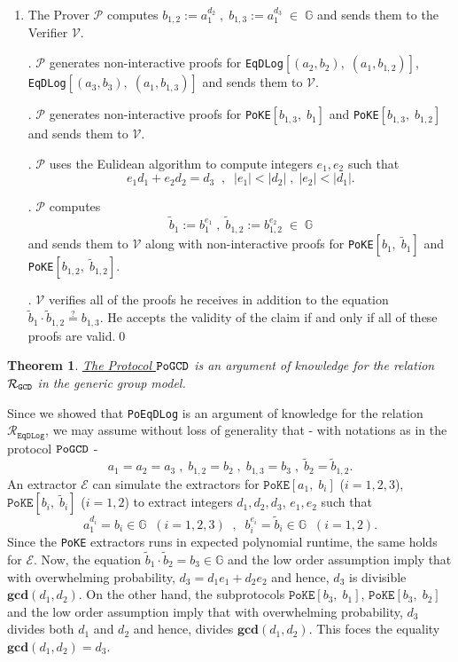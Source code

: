 \documentclass[11pt, lettersize, notitlepage, leqno, footskip=0.6cm]{article}
\newcommand{\ttt}{\texttt}
\newcommand{\bG}{\mathbb{G}}
\newcommand{\wti}{\widetilde}
\newcommand{\mc}{\mathcal}
\newcommand{\mbf}{\mathbf}
\newcommand{\mP}{\mc{P}}
\newcommand{\V}{\mc{V}}
\newcommand{\vs}{\vspace{-0.15cm}}
\newcommand{\op}{overwhelming probability}
\newcommand{\GCD}{\mbf{gcd}}
\newcommand{\E}{\mc{E}}
\newtheorem{Thm}{Theorem}[section]
\numberwithin{equation}{section}
\begin{document}
\begin{enumerate}[wide, labelwidth=!, labelindent=0pt]\vs \item The Prover $\mc{P}$ computes $b_{1,2}:= a_1^{d_2}\;,\; b_{1,3}:= a_1^{d_3}\;\in\;\bG$ and sends them to the Verifier $\V$.

. $\mP$ generates non-interactive proofs for \verb|EqDLog|$[(a_2, b_2),\; (a_1, b_{1,2})]$, \verb|EqDLog|$[(a_3, b_3),\; (a_1, b_{1,3})]$ and sends them to $\mc{V}$.

. $\mc{P}$ generates non-interactive proofs for \verb|PoKE|$[b_{1,3},\;b_1 ]$ and \verb|PoKE|$[b_{1,3},\;b_{1,2} ]$ and sends them to $\V$.

. $\mc{P}$ uses the Eulidean algorithm to compute integers $e_1, e_2$ such that \vs $$e_1d_1 + e_2d_2 = d_3\;\;,\;\; |e_1| < |d_2|\;,\; |e_2| < |d_1|.$$

. $\mc{P}$ computes $$\wti{b}_1:= b_1^{e_1}\;,\; \wti{b}_{1,2}:= b_{1,2}^{e_2}\;\in\;\bG $$ and sends them to $\V$ along with non-interactive proofs for \verb|PoKE|$[b_1,\; \wti{b}_1]$ and \verb|PoKE|$[b_{1,2},\; \wti{b}_{1,2}]$.

. $\mc{V}$ verifies all of the proofs he receives in addition to the equation $\wti{b}_1\cdot \wti{b}_{1,2}\stackrel{?}{=} b_{1,3}$. He accepts the validity of the claim if and only if all of these proofs are valid.\qed \end{enumerate}



\begin{Thm}\label{GCDProof} \hyperlink{GCD}{The Protocol $\tt{PoGCD}$} is an argument of knowledge for the relation $\mc{R}_{{\tt{GCD}}}$ in the generic group model.\end{Thm}

\begin{prf} Since we showed that \verb|PoEqDLog| is an argument of knowledge for the relation $\mc{R}_{\ttt{EqDLog}}$, we may assume without loss of generality that - with notations as in the protocol \hyperlink{GCD}{$\tt{PoGCD}$} - \vs $$a_1 = a_2 = a_3\;,\; {b}_{1,2} = b_2\;,\;{b}_{1,3} = b_3\;,\;\wti{b}_{2} = \wti{b}_{1,2} .$$ An extractor $\E$ can simulate the extractors for $\ttt{PoKE}[a_1,\; b_i]$ ($i=1,2,3$), $\ttt{PoKE}[b_i,\;\wti{b}_i]$ ($i=1,2$) to extract integers $d_1,d_2,d_3$, $e_1,e_2$ such that \vs $$a_1^{d_i} = b_i\in\bG\;\; (i=1,2,3)\;\;,\;\;b_i^{e_i} = \wti{b}_i\in\bG \;\;(i=1,2).$$ Since the \ttt{PoKE} extractors runs in expected polynomial runtime, the same holds for $\E$. Now, the equation $\wti{b}_1\cdot \wti{b}_2 = b_3\in \bG$ and the low order assumption imply that with \op, $d_3 = d_1e_1 + d_2e_2 $ and hence, $d_3$ is divisible $\GCD(d_1,d_2)$. On the other hand, the subprotocols $\ttt{PoKE}[b_3,\;b_1]$, $\ttt{PoKE}[b_3,\;b_2]$ and the low order assumption imply that with \op, $d_3$ divides both $d_1$ and $d_2$ and hence, divides $\GCD(d_1,d_2)$. This foces the equality $\GCD(d_1,d_2) = d_3$.\end{prf}
\end{document}

